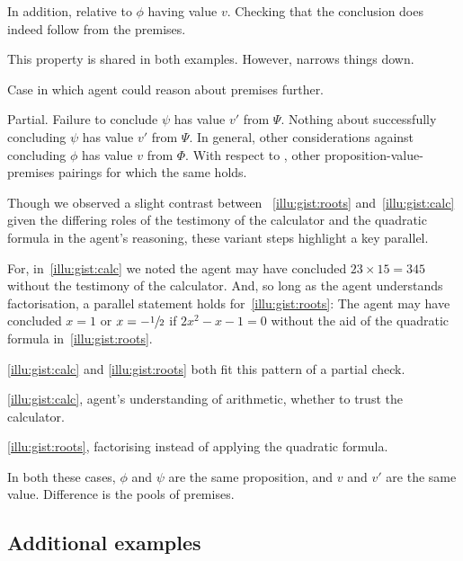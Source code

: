 \begin{note}
  In addition, relative to \(\phi\) having value \(v\).
  Checking that the conclusion does indeed follow from the premises.

  This property is shared in both examples.
  However, narrows things down.

  Case in which agent could reason about premises further.
\end{note}

\begin{note}
  Partial.
  Failure to conclude \(\psi\) has value \(v'\) from \(\Psi\).
  Nothing about successfully concluding \(\psi\) has value \(v'\) from \(\Psi\).
  In general, other considerations against concluding \(\phi\) has value \(v\) from \(\Phi\).
  With respect to , other proposition-value-premises pairings for which the same holds.
\end{note}

\begin{note}
  \color{red}
  Though we observed a slight contrast between ~\ref{illu:gist:roots} and~\ref{illu:gist:calc} given the differing roles of the testimony of the calculator and the quadratic formula in the agent's reasoning, these variant steps highlight a key parallel.

  For, in~\autoref{illu:gist:calc} we noted the agent may have concluded \(23 \times 15 = 345\) without the testimony of the calculator.
  And, so long as the agent understands factorisation, a parallel statement holds for~\ref{illu:gist:roots}:
  The agent may have concluded \(x = 1\) or \(x = -\sfrac{1}{2}\) if \(2x^{2} - x - 1 = 0\) without the aid of the quadratic formula in~\autoref{illu:gist:roots}.
\end{note}

\begin{note}
   \ref{illu:gist:calc} and \ref{illu:gist:roots} both fit this pattern of a partial check.

  \autoref{illu:gist:calc}, agent's understanding of arithmetic, whether to trust the calculator.

  \autoref{illu:gist:roots}, factorising instead of applying the quadratic formula.

  In both these cases, \(\phi\) and \(\psi\) are the same proposition, and \(v\) and \(v'\) are the same value.
  Difference is the pools of premises.
\end{note}

\subsection{Additional examples}

